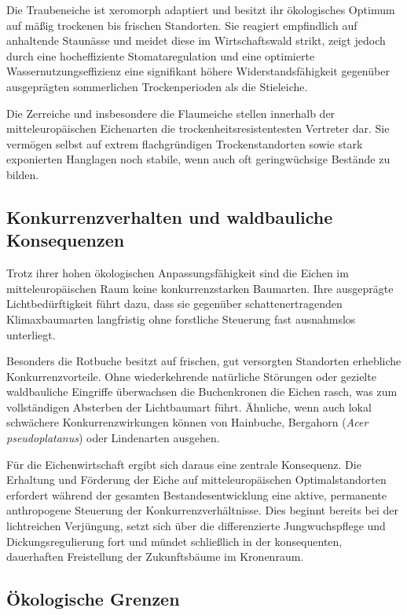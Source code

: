 \documentclass[twocolumn, bibliography=totoc, abstract=true]{scrartcl}
\begin{document}
Die Traubeneiche ist xeromorph adaptiert und besitzt ihr ökologisches Optimum auf mäßig trockenen bis frischen Standorten. Sie reagiert empfindlich auf anhaltende Staunässe und meidet diese im Wirtschaftswald strikt, zeigt jedoch durch eine hocheffiziente Stomataregulation und eine optimierte Wassernutzungseffizienz eine signifikant höhere Widerstandsfähigkeit gegenüber ausgeprägten sommerlichen Trockenperioden als die Stieleiche.

Die Zerreiche und insbesondere die Flaumeiche stellen innerhalb der mitteleuropäischen Eichenarten die trockenheitsresistentesten Vertreter dar. Sie vermögen selbst auf extrem flachgründigen Trockenstandorten sowie stark exponierten Hanglagen noch stabile, wenn auch oft geringwüchsige Bestände zu bilden.

\subsection{Konkurrenzverhalten und waldbauliche Konsequenzen}

Trotz ihrer hohen ökologischen Anpassungsfähigkeit sind die Eichen im mitteleuropäischen Raum keine konkurrenzstarken Baumarten. Ihre ausgeprägte Lichtbedürftigkeit führt dazu, dass sie gegenüber schattenertragenden Klimaxbaumarten langfristig ohne forstliche Steuerung fast ausnahmslos unterliegt.

Besonders die Rotbuche besitzt auf frischen, gut versorgten Standorten erhebliche Konkurrenzvorteile. Ohne wiederkehrende natürliche Störungen oder gezielte waldbauliche Eingriffe überwachsen die Buchenkronen die Eichen rasch, was zum vollständigen Absterben der Lichtbaumart führt. Ähnliche, wenn auch lokal schwächere Konkurrenzwirkungen können von Hainbuche, Bergahorn (\textit{Acer pseudoplatanus}) oder Lindenarten ausgehen.

Für die Eichenwirtschaft ergibt sich daraus eine zentrale Konsequenz. Die Erhaltung und Förderung der Eiche auf mitteleuropäischen Optimalstandorten erfordert während der gesamten Bestandesentwicklung eine aktive, permanente anthropogene Steuerung der Konkurrenzverhältnisse. Dies beginnt bereits bei der lichtreichen Verjüngung, setzt sich über die differenzierte Jungwuchspflege und Dickungsregulierung fort und mündet schließlich in der konsequenten, dauerhaften Freistellung der Zukunftsbäume im Kronenraum.

\subsection{Ökologische Grenzen}
\end{document}
